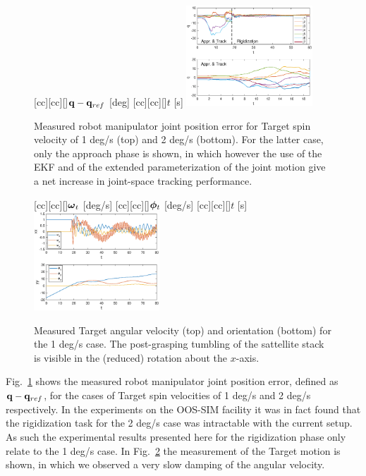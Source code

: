 %
\begin{figure}[t!]
[cc][cc][\FontFigB]{$\boldsymbol {\mathrm{q}}-\boldsymbol {\mathrm{q}}{}_{ref}$ [deg]}
[cc][cc][\FontFigB]{$t$ [s]}
\centering\includegraphics[angle=0,width=0.42\textwidth]{./figures/joint_space_motion_2subplots_2}
\caption{Measured robot manipulator joint position error for Target spin velocity of 1 deg/s (top) and 2 deg/s (bottom). For the latter case, only the approach phase is shown, in which however the use of the EKF and of the extended parameterization of the joint motion give a net increase in joint-space tracking performance.}
\label{fig:joint_space_motion_2subplots}
\end{figure}
%
%
\begin{figure}[t!]
[cc][cc][\FontFigB]{$\boldsymbol {\mathrm{\omega}}{}_{t}$ [deg/s]}
[cc][cc][\FontFigB]{$\boldsymbol {\mathrm{\phi}}{}_{t}$ [deg/s]}
[cc][cc][\FontFigB]{$t$ [s]}
\centering\includegraphics[angle=0,width=0.42\textwidth]{./figures/Target_motion}
\caption{Measured Target angular velocity (top) and orientation (bottom) for the 1 deg/s case. The post-grasping tumbling of the sattellite stack is visible in the (reduced) rotation about the $x$-axis.}
\label{fig:Target_motion}
\end{figure}
%

Fig.~\ref{fig:joint_space_motion_2subplots} shows the measured robot manipulator joint position error, defined as $\boldsymbol {\mathrm{q}}-\boldsymbol {\mathrm{q}}{}_{ref}$, for the cases of Target spin velocities of 1 deg/s and 2 deg/s respectively. In the experiments on the OOS-SIM facility it was in fact found that the rigidization task for the 2 deg/s case was intractable with the current setup.  As such the experimental results presented here for the rigidization phase only relate to the 1 deg/s case. In Fig.~\ref{fig:Target_motion} the measurement of the Target motion is shown, in which we observed a very slow damping of the angular velocity. 

